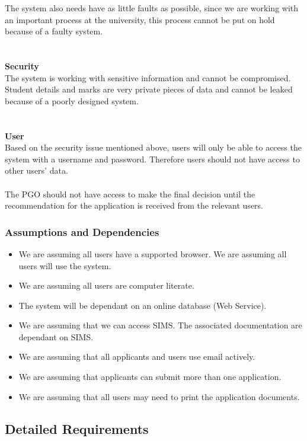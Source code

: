 \documentclass{article}
\begin{document}
The system also needs have as little faults as possible, since we are working with an important process at the university, this process cannot be put on hold because of a faulty system. \\ \\ \\
\textbf{Security} \\
The system is working with sensitive information and cannot be compromised. Student details and marks are very private pieces of data and cannot be leaked because of a poorly designed system. \\ \\ \\
\textbf{User} \\
Based on the security issue mentioned above, users will only be able to access the system with a username and password. Therefore users should not have access to other users' data. \\ \\
The PGO should not have access to make the final decision until the recommendation for the application is received from the relevant users. \\ 
\subsubsection{Assumptions and Dependencies}
\begin{itemize}
\item We are assuming all users have a supported browser. We are assuming all users will use the system.
\item We are assuming all users are computer literate. 
\item The system will be dependant on an online database (Web Service).
\item We are assuming that we can access SIMS. The associated documentation are dependant on SIMS.
\item We are assuming that all applicants and users use email actively.
\item We are assuming that applicants can submit more than one application.
\item We are assuming that all users may need to print the application documents.
\end{itemize}
\subsection{Detailed Requirements}
\end{document}
